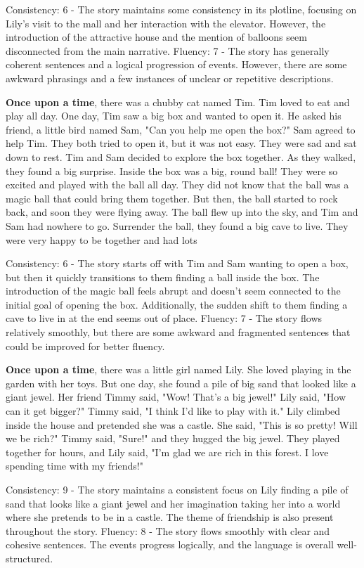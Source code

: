 \documentclass{article}
\begin{document}
Consistency: 6 - The story maintains some consistency in its plotline, focusing on Lily's visit to the mall and her interaction with the elevator. However, the introduction of the attractive house and the mention of balloons seem disconnected from the main narrative.
Fluency: 7 - The story has generally coherent sentences and a logical progression of events. However, there are some awkward phrasings and a few instances of unclear or repetitive descriptions.

\textbf{Once upon a time}, there was a chubby cat named Tim. Tim loved to eat and play all day. One day, Tim saw a big box and wanted to open it. He asked his friend, a little bird named Sam, "Can you help me open the box?" Sam agreed to help Tim. They both tried to open it, but it was not easy. They were sad and sat down to rest. Tim and Sam decided to explore the box together. As they walked, they found a big surprise. Inside the box was a big, round ball! They were so excited and played with the ball all day. They did not know that the ball was a magic ball that could bring them together. But then, the ball started to rock back, and soon they were flying away. The ball flew up into the sky, and Tim and Sam had nowhere to go. Surrender the ball, they found a big cave to live. They were very happy to be together and had lots

Consistency: 6 - The story starts off with Tim and Sam wanting to open a box, but then it quickly transitions to them finding a ball inside the box. The introduction of the magic ball feels abrupt and doesn't seem connected to the initial goal of opening the box. Additionally, the sudden shift to them finding a cave to live in at the end seems out of place.
Fluency: 7 - The story flows relatively smoothly, but there are some awkward and fragmented sentences that could be improved for better fluency.

\textbf{Once upon a time}, there was a little girl named Lily. She loved playing in the garden with her toys. But one day, she found a pile of big sand that looked like a giant jewel. Her friend Timmy said, "Wow! That's a big jewel!" Lily said, "How can it get bigger?" Timmy said, "I think I'd like to play with it." Lily climbed inside the house and pretended she was a castle. She said, "This is so pretty! Will we be rich?" Timmy said, "Sure!" and they hugged the big jewel. They played together for hours, and Lily said, "I'm glad we are rich in this forest. I love spending time with my friends!"

Consistency: 9 - The story maintains a consistent focus on Lily finding a pile of sand that looks like a giant jewel and her imagination taking her into a world where she pretends to be in a castle. The theme of friendship is also present throughout the story.
Fluency: 8 - The story flows smoothly with clear and cohesive sentences. The events progress logically, and the language is overall well-structured.
\end{document}
